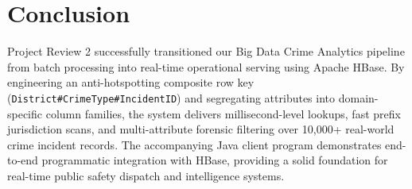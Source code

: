 \documentclass[12pt, a4paper]{article}
\begin{document}
\section{Conclusion}
Project Review 2 successfully transitioned our Big Data Crime Analytics pipeline from batch processing into real-time operational serving using Apache HBase. By engineering an anti-hotspotting composite row key (\texttt{District\#CrimeType\#IncidentID}) and segregating attributes into domain-specific column families, the system delivers millisecond-level lookups, fast prefix jurisdiction scans, and multi-attribute forensic filtering over 10,000+ real-world crime incident records. The accompanying Java client program demonstrates end-to-end programmatic integration with HBase, providing a solid foundation for real-time public safety dispatch and intelligence systems.
\end{document}
